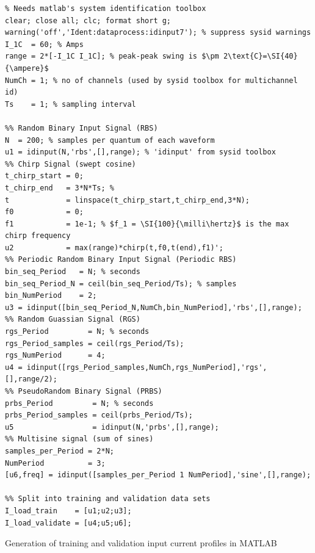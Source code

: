 \begin{listing}[!htbp]
\begin{verbatim}
% Needs matlab's system identification toolbox
clear; close all; clc; format short g;
warning('off','Ident:dataprocess:idinput7'); % suppress sysid warnings
I_1C  = 60; % Amps
range = 2*[-I_1C I_1C]; % peak-peak swing is $\pm 2\text{C}=\SI{40}{\ampere}$
NumCh = 1; % no of channels (used by sysid toolbox for multichannel id)
Ts    = 1; % sampling interval

%% Random Binary Input Signal (RBS)
N  = 200; % samples per quantum of each waveform
u1 = idinput(N,'rbs',[],range); % 'idinput' from sysid toolbox
%% Chirp Signal (swept cosine)
t_chirp_start = 0;
t_chirp_end   = 3*N*Ts; %
t             = linspace(t_chirp_start,t_chirp_end,3*N);
f0            = 0;
f1            = 1e-1; % $f_1 = \SI{100}{\milli\hertz}$ is the max chirp frequency
u2            = max(range)*chirp(t,f0,t(end),f1)';
%% Periodic Random Binary Input Signal (Periodic RBS)
bin_seq_Period   = N; % seconds
bin_seq_Period_N = ceil(bin_seq_Period/Ts); % samples
bin_NumPeriod    = 2;
u3 = idinput([bin_seq_Period_N,NumCh,bin_NumPeriod],'rbs',[],range);
%% Random Guassian Signal (RGS)
rgs_Period         = N; % seconds
rgs_Period_samples = ceil(rgs_Period/Ts);
rgs_NumPeriod      = 4;
u4 = idinput([rgs_Period_samples,NumCh,rgs_NumPeriod],'rgs',[],range/2);
%% PseudoRandom Binary Signal (PRBS)
prbs_Period         = N; % seconds
prbs_Period_samples = ceil(prbs_Period/Ts);
u5                  = idinput(N,'prbs',[],range);
%% Multisine signal (sum of sines)
samples_per_Period = 2*N;
NumPeriod          = 3;
[u6,freq] = idinput([samples_per_Period 1 NumPeriod],'sine',[],range);

%% Split into training and validation data sets
I_load_train    = [u1;u2;u3];
I_load_validate = [u4;u5;u6];
\end{verbatim}
\caption{Generation of training and validation input current profiles in
\textsc{MATLAB}}
\label{codesnippet:trainvalidsysidinput}
\end{listing}


